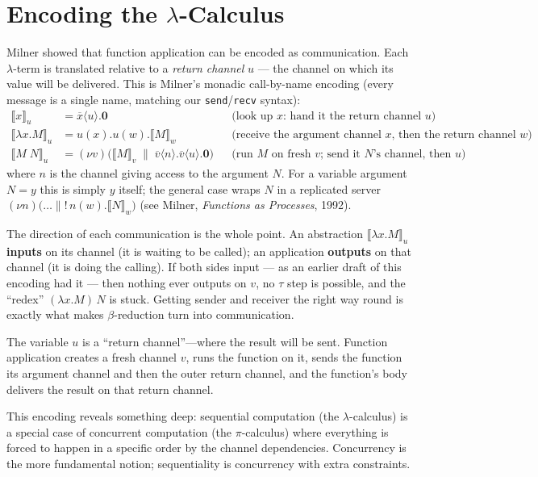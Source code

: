 \documentclass[11pt, a4paper, oneside]{book}
\newcommand{\nil}{\mathbf{0}}
\newcommand{\Par}{\mathbin{\|}}
\newcommand{\res}[1]{(\nu #1)}
\newcommand{\repl}{\mathbin{!}}
\newcommand{\inp}[2]{#1(#2)}
\newcommand{\outp}[2]{\overline{#1}\langle #2 \rangle}
\newcommand{\lc}[1]{\texttt{#1}}
\begin{document}
\section{Encoding the $\lambda$-Calculus}

Milner showed that function application can be encoded as communication.
Each $\lambda$-term is translated relative to a \emph{return channel} $u$ ---
the channel on which its value will be delivered. This is Milner's monadic
call-by-name encoding (every message is a single name, matching our
\lc{send}/\lc{recv} syntax):
\begin{align*}
  ⟦x⟧_u &= \outp{x}{u}.\nil
    &&\text{(look up $x$: hand it the return channel $u$)} \\
  ⟦\lambda x. M⟧_u &=
    \inp{u}{x}.\inp{u}{w}.⟦M⟧_w
    &&\text{(receive the argument channel $x$, then the return channel $w$)} \\
  ⟦M\;N⟧_u &=
    \res{v}\bigl(⟦M⟧_v \;\Par\;
      \outp{v}{n}.\outp{v}{u}.\nil\bigr)
    &&\text{(run $M$ on fresh $v$; send it $N$'s channel, then $u$)}
\end{align*}
where $n$ is the channel giving access to the argument $N$. For a variable
argument $N = y$ this is simply $y$ itself; the general case wraps $N$ in a
replicated server $\res{n}\bigl(\ldots \Par \repl\, \inp{n}{w}.⟦N⟧_w\bigr)$
(see Milner, \emph{Functions as Processes}, 1992).

\begin{warning}[title={Polarity matters}]
The direction of each communication is the whole point. An abstraction
$⟦\lambda x.M⟧_u$ \textbf{inputs} on its channel (it is waiting to be called);
an application \textbf{outputs} on that channel (it is doing the calling). If
both sides input --- as an earlier draft of this encoding had it --- then
nothing ever outputs on $v$, no $\tau$ step is possible, and the ``redex''
$(\lambda x.M)\,N$ is stuck. Getting sender and receiver the right way round
is exactly what makes $\beta$-reduction turn into communication.
\end{warning}

The variable $u$ is a ``return channel''---where the result will be sent.
Function application creates a fresh channel $v$, runs the function on it,
sends the function its argument channel and then the outer return channel,
and the function's body delivers the result on that return channel.

\begin{intuition}
This encoding reveals something deep: sequential computation (the
$\lambda$-calculus) is a special case of concurrent computation (the
$\pi$-calculus) where everything is forced to happen in a specific order
by the channel dependencies. Concurrency is the more fundamental notion;
sequentiality is concurrency with extra constraints.
\end{intuition}
\end{document}

